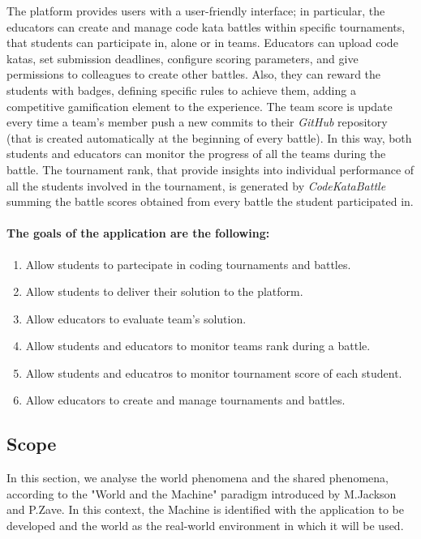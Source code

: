 \documentclass[a4paper, 11pt, titlepage]{article}
\begin{document}
The platform provides users with a user-friendly interface; in particular, the educators can create and manage code kata battles within specific tournaments, that students can participate in, alone or in teams. Educators can upload code katas, set submission deadlines, configure scoring parameters, and give permissions to colleagues to create other battles. 
Also, they can reward the students with badges, defining specific rules to achieve them, adding a competitive gamification element to the experience.
The team score is update every time a team's member push a new commits to their \textit{GitHub} repository (that is created automatically at the beginning of every battle). In this way, both students and educators can monitor the progress of all the teams during the battle.
The tournament rank, that provide insights into individual performance of all the students involved in the tournament, is generated by \textit{CodeKataBattle} summing the battle scores obtained from every battle the student participated in.

\paragraph{The goals of the application are the following:}
\begin{enumerate} [label=G\arabic*:, align=left, leftmargin=*]
    \item Allow students to partecipate in coding tournaments and battles.
    \item Allow students to deliver their solution to the platform.
    \item Allow educators to evaluate team's solution.
    \item Allow students and educators to monitor teams rank during a battle.
    \item Allow students and educatros to monitor tournament score of each student. 
    \item Allow educators to create and manage tournaments and battles.
\end{enumerate}


\subsection{Scope}

In this section, we analyse the world phenomena and the shared phenomena, according to the "World and the Machine" paradigm introduced by M.Jackson and P.Zave. In this context, the Machine is identified with the application to be developed and the world as the real-world environment in which it will be used.
\end{document}
